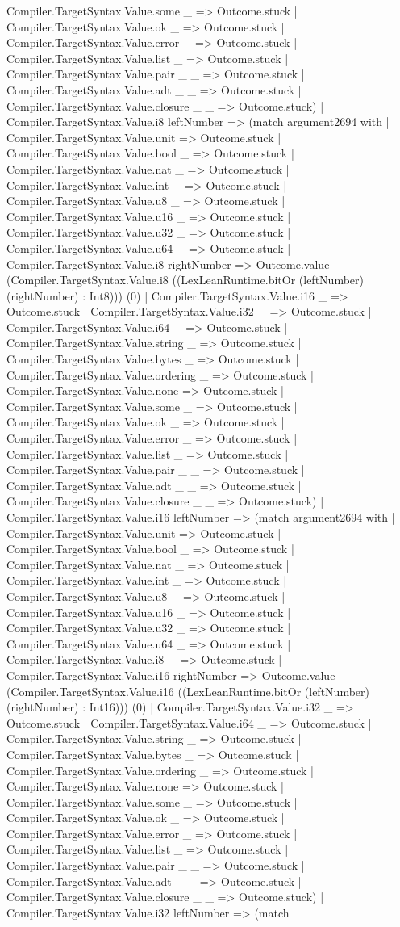 \documentclass[11pt]{article}
\begin{document}
Compiler.TargetSyntax.Value.some \_ => Outcome.stuck | Compiler.TargetSyntax.Value.ok \_ => Outcome.stuck | Compiler.TargetSyntax.Value.error \_ => Outcome.stuck | Compiler.TargetSyntax.Value.list \_ => Outcome.stuck | Compiler.TargetSyntax.Value.pair \_ \_ => Outcome.stuck | Compiler.TargetSyntax.Value.adt \_ \_ => Outcome.stuck | Compiler.TargetSyntax.Value.closure \_ \_ => Outcome.stuck) | Compiler.TargetSyntax.Value.i8 leftNumber => (match argument2694 with | Compiler.TargetSyntax.Value.unit => Outcome.stuck | Compiler.TargetSyntax.Value.bool \_ => Outcome.stuck | Compiler.TargetSyntax.Value.nat \_ => Outcome.stuck | Compiler.TargetSyntax.Value.int \_ => Outcome.stuck | Compiler.TargetSyntax.Value.u8 \_ => Outcome.stuck | Compiler.TargetSyntax.Value.u16 \_ => Outcome.stuck | Compiler.TargetSyntax.Value.u32 \_ => Outcome.stuck | Compiler.TargetSyntax.Value.u64 \_ => Outcome.stuck | Compiler.TargetSyntax.Value.i8 rightNumber => Outcome.value (Compiler.TargetSyntax.Value.i8 ((LexLeanRuntime.bitOr (leftNumber) (rightNumber) : Int8))) (0) | Compiler.TargetSyntax.Value.i16 \_ => Outcome.stuck | Compiler.TargetSyntax.Value.i32 \_ => Outcome.stuck | Compiler.TargetSyntax.Value.i64 \_ => Outcome.stuck | Compiler.TargetSyntax.Value.string \_ => Outcome.stuck | Compiler.TargetSyntax.Value.bytes \_ => Outcome.stuck | Compiler.TargetSyntax.Value.ordering \_ => Outcome.stuck | Compiler.TargetSyntax.Value.none => Outcome.stuck | Compiler.TargetSyntax.Value.some \_ => Outcome.stuck | Compiler.TargetSyntax.Value.ok \_ => Outcome.stuck | Compiler.TargetSyntax.Value.error \_ => Outcome.stuck | Compiler.TargetSyntax.Value.list \_ => Outcome.stuck | Compiler.TargetSyntax.Value.pair \_ \_ => Outcome.stuck | Compiler.TargetSyntax.Value.adt \_ \_ => Outcome.stuck | Compiler.TargetSyntax.Value.closure \_ \_ => Outcome.stuck) | Compiler.TargetSyntax.Value.i16 leftNumber => (match argument2694 with | Compiler.TargetSyntax.Value.unit => Outcome.stuck | Compiler.TargetSyntax.Value.bool \_ => Outcome.stuck | Compiler.TargetSyntax.Value.nat \_ => Outcome.stuck | Compiler.TargetSyntax.Value.int \_ => Outcome.stuck | Compiler.TargetSyntax.Value.u8 \_ => Outcome.stuck | Compiler.TargetSyntax.Value.u16 \_ => Outcome.stuck | Compiler.TargetSyntax.Value.u32 \_ => Outcome.stuck | Compiler.TargetSyntax.Value.u64 \_ => Outcome.stuck | Compiler.TargetSyntax.Value.i8 \_ => Outcome.stuck | Compiler.TargetSyntax.Value.i16 rightNumber => Outcome.value (Compiler.TargetSyntax.Value.i16 ((LexLeanRuntime.bitOr (leftNumber) (rightNumber) : Int16))) (0) | Compiler.TargetSyntax.Value.i32 \_ => Outcome.stuck | Compiler.TargetSyntax.Value.i64 \_ => Outcome.stuck | Compiler.TargetSyntax.Value.string \_ => Outcome.stuck | Compiler.TargetSyntax.Value.bytes \_ => Outcome.stuck | Compiler.TargetSyntax.Value.ordering \_ => Outcome.stuck | Compiler.TargetSyntax.Value.none => Outcome.stuck | Compiler.TargetSyntax.Value.some \_ => Outcome.stuck | Compiler.TargetSyntax.Value.ok \_ => Outcome.stuck | Compiler.TargetSyntax.Value.error \_ => Outcome.stuck | Compiler.TargetSyntax.Value.list \_ => Outcome.stuck | Compiler.TargetSyntax.Value.pair \_ \_ => Outcome.stuck | Compiler.TargetSyntax.Value.adt \_ \_ => Outcome.stuck | Compiler.TargetSyntax.Value.closure \_ \_ => Outcome.stuck) | Compiler.TargetSyntax.Value.i32 leftNumber => (match 
\end{document}
